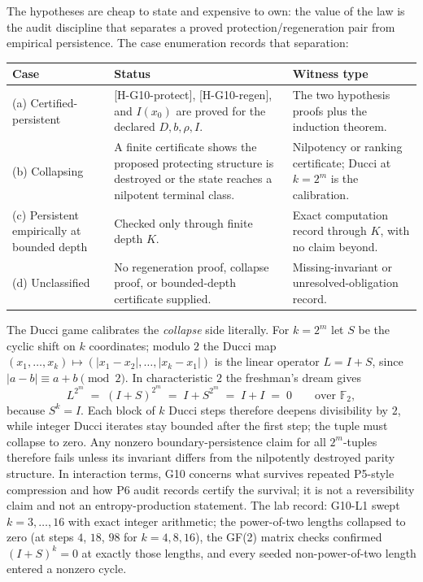 \documentclass[11pt]{article}
\theoremstyle{definition}
\begin{document}
The hypotheses are cheap to state and expensive to own: the value of the law is the audit discipline
that separates a proved protection/regeneration pair from empirical persistence. The case enumeration
records that separation:

\begin{center}
\footnotesize
\begin{tabularx}{\textwidth}{@{}lXX@{}}
\toprule
Case & Status & Witness type \\
\midrule
(a) Certified-persistent & \textup{[H-G10-protect]}, \textup{[H-G10-regen]}, and $I(x_0)$ are proved
for the declared $D, b, \rho, I$. & The two hypothesis proofs plus the induction theorem. \\
(b) Collapsing & A finite certificate shows the proposed protecting structure is destroyed or the
state reaches a nilpotent terminal class. & Nilpotency or ranking certificate; Ducci at $k = 2^m$ is
the calibration. \\
(c) Persistent empirically at bounded depth & Checked only through finite depth $K$. & Exact
computation record through $K$, with no claim beyond. \\
(d) Unclassified & No regeneration proof, collapse proof, or bounded-depth certificate supplied. &
Missing-invariant or unresolved-obligation record. \\
\bottomrule
\end{tabularx}
\end{center}

The Ducci game calibrates the \emph{collapse} side literally. For $k = 2^m$ let $S$ be the cyclic
shift on $k$ coordinates; modulo $2$ the Ducci map $(x_1, \ldots, x_k) \mapsto (|x_1 - x_2|, \ldots,
|x_k - x_1|)$ is the linear operator $L = I + S$, since $|a - b| \equiv a + b \pmod 2$. In
characteristic $2$ the freshman's dream gives
\[
  L^{2^m} \;=\; (I + S)^{2^m} \;=\; I + S^{2^m} \;=\; I + I \;=\; 0
  \qquad \text{over } \mathbb{F}_2,
\]
because $S^k = I$. Each block of $k$ Ducci steps therefore deepens divisibility by $2$, while integer
Ducci iterates stay bounded after the first step; the tuple must collapse to zero. Any nonzero
boundary-persistence claim for all $2^m$-tuples therefore fails unless its invariant differs from the
nilpotently destroyed parity structure. In interaction terms, G10 concerns what survives repeated
P5-style compression and how P6 audit records certify the survival; it is not a reversibility claim
and not an entropy-production statement. The lab record: G10-L1 swept $k = 3, \ldots, 16$ with exact
integer arithmetic; the power-of-two lengths collapsed to zero (at steps $4$, $18$, $98$ for
$k = 4, 8, 16$), the GF(2) matrix checks confirmed $(I+S)^k = 0$ at exactly those lengths, and every
seeded non-power-of-two length entered a nonzero cycle.
\end{document}
